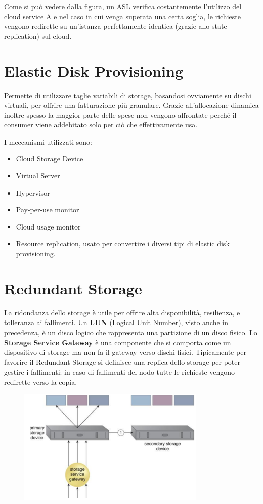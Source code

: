 Come si può vedere dalla figura, un ASL verifica costantemente l'utilizzo del cloud service A e nel caso in cui venga superata una certa soglia, le richieste vengono redirette su un'istanza perfettamente identica (grazie allo state replication) sul cloud.

\section{Elastic Disk Provisioning}
Permette di utilizzare taglie variabili di storage, basandosi ovviamente su dischi virtuali, per offrire una fatturazione più granulare. Grazie all'allocazione dinamica inoltre spesso la maggior parte delle spese non vengono affrontate perché il consumer viene addebitato solo per ciò che effettivamente usa.

I meccanismi utilizzati sono:
\begin{itemize}
    \item Cloud Storage Device
    \item Virtual Server
    \item Hypervisor
    \item Pay-per-use monitor
    \item Cloud usage monitor
    \item Resource replication, usato per convertire i diversi tipi di elastic disk provisioning.
\end{itemize}

\section{Redundant Storage}
La ridondanza dello storage è utile per offrire alta disponibilità, resilienza, e tolleranza ai fallimenti. Un \textbf{LUN} (Logical Unit Number), visto anche in precedenza, è un disco logico che rappresenta una partizione di un disco fisico. Lo \textbf{Storage Service Gateway} è una componente che si comporta come un dispositivo di storage ma non fa il gateway verso dischi fisici. Tipicamente per favorire il Redundant Storage si definisce una replica dello storage per poter gestire i fallimenti: in caso di fallimenti del nodo tutte le richieste vengono redirette verso la copia. 

\begin{figure}[htb!]
    \centering
    \includegraphics[width=9cm]{./Images/cap11/11.6.png}
\end{figure}

